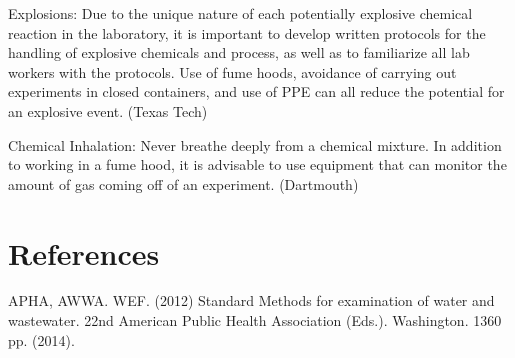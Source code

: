 \documentclass[12pt]{../SOP2}
\begin{document}
Explosions: Due to the unique nature of each potentially explosive chemical reaction in the laboratory, it is important to develop written protocols for the handling of explosive chemicals and process, as well as to familiarize all lab workers with the protocols.  Use of fume hoods, avoidance of carrying out experiments in closed containers, and use of PPE can all reduce the potential for an explosive event.  (Texas Tech)

Chemical Inhalation: Never breathe deeply from a chemical mixture.  In addition to working in a fume hood, it is advisable to use equipment that can monitor the amount of gas coming off of an experiment. (Dartmouth)



\section{References}

\NP APHA, AWWA. WEF. (2012) Standard Methods for examination of water and wastewater. 22nd American Public Health Association (Eds.). Washington. 1360 pp. (2014).
\end{document}

